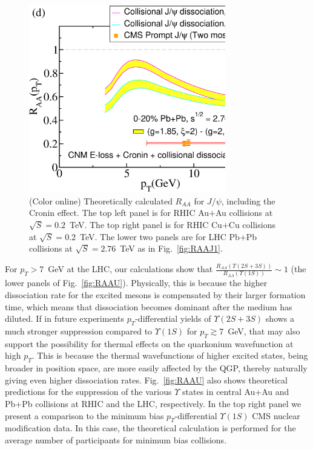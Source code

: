\documentclass[article,showpacs,preprintnumbers,amsmath,amssymb]{revtex4}
\begin{document}
\begin{figure}[!b]
\includegraphics[width=3.38in,angle=0]{fig19_lhc2760pbpbcroninraa.eps} 
\caption{(Color online) Theoretically calculated $R_{AA}$ for $J/\psi$, including the 
Cronin effect. The top left panel
is for RHIC Au$+$Au collisions at $\sqrt{S}=0.2$~TeV. The top right panel is for RHIC
Cu$+$Cu collisions at $\sqrt{S}=0.2$~TeV. The lower two panels are for LHC Pb$+$Pb
collisions at $\sqrt{S}=2.76$~TeV as in Fig.~\ref{fig:RAAJ1}.~\label{fig:RAAJ1Cronin}}
\end{figure}


For $p_T > 7$~GeV at the LHC, our calculations show that
$\frac{R_{AA}(\Upsilon(2S+3S))}{R_{AA}(\Upsilon(1S))}\sim 1$ (the lower panels
of Fig.~\ref{fig:RAAU}). Physically, this is because the higher dissociation
rate for the excited mesons is compensated by their larger formation time,
which means that dissociation becomes dominant after the medium has diluted.
If in future experiments $p_T$-differential yields of $\Upsilon(2S+3S)$ shows a
much stronger suppression compared to $\Upsilon(1S)$ for $p_T\gtrsim 7$~GeV,
that may also support the possibility for thermal effects on the quarkonium
wavefunction at high $p_T$. This is because the thermal wavefunctions of higher
excited states, being broader in position space, are more easily affected by
the QGP, thereby naturally giving even higher dissociation rates.
Fig.~\ref{fig:RAAU} also shows theoretical predictions for the suppression of
the various $\Upsilon$ states in central Au+Au and Pb+Pb collisions at RHIC and
the LHC, respectively. In the top right panel we present a comparison to the
minimum bias $p_T$-differential $\Upsilon(1S)$ CMS nuclear modification data.
In this case, the theoretical calculation is performed for the average number
of participants for minimum bias collisions.
\end{document}
